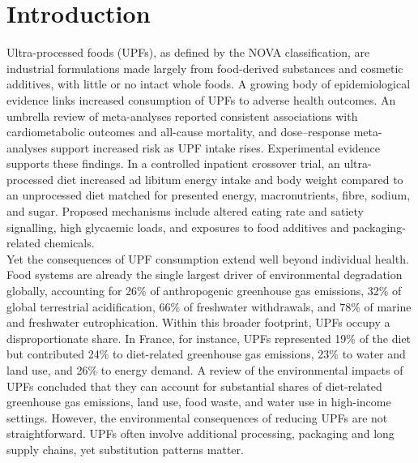 \documentclass{article}
\begin{document}
\thispagestyle{empty}
\clearpage
\bigskip
\thispagestyle{empty}
\clearpage
\setcounter{page}{1}

\section{Introduction}

Ultra-processed foods (UPFs), as defined by the NOVA classification, are industrial formulations made largely from food-derived substances and cosmetic additives, with little or no intact whole foods.\cite{Monteiro2019UPFIdentify,Monteiro2019FAO} A growing body of epidemiological evidence links increased consumption of UPFs to adverse health outcomes. An umbrella review of meta-analyses reported consistent associations with cardiometabolic outcomes and all-cause mortality,\cite{Lane2024BMJ} and dose--response meta-analyses support increased risk as UPF intake rises.\cite{Qu2024} Experimental evidence supports these findings. In a controlled inpatient crossover trial, an ultra-processed diet increased ad libitum energy intake and body weight compared to an unprocessed diet matched for presented energy, macronutrients, fibre, sodium, and sugar.\cite{Hall2019} Proposed mechanisms include altered eating rate and satiety signalling, high glycaemic loads, and exposures to food additives and packaging-related chemicals.\cite{Monteiro2019FAO,Lane2024BMJ,Yates2024}\\

Yet the consequences of UPF consumption extend well beyond individual health. Food systems are already the single largest driver of environmental degradation globally, accounting for 26\% of anthropogenic greenhouse gas emissions, 32\% of global terrestrial acidification, 66\% of freshwater withdrawals, and 78\% of marine and freshwater eutrophication.\cite{PooreNemecek2018,Crippa2021NatureFood} Within this broader footprint, UPFs occupy a disproportionate share. In France, for instance, UPFs represented 19\% of the diet but contributed 24\% to diet-related greenhouse gas emissions, 23\% to water and land use, and 26\% to energy demand.\cite{KesseGuyot2023} A review of the environmental impacts of UPFs concluded that they can account for substantial shares of diet-related greenhouse gas emissions, land use, food waste, and water use in high-income settings.\cite{Anastasiou2022JCP} However, the environmental consequences of reducing UPFs are not straightforward. UPFs often involve additional processing, packaging and long supply chains,\citep{Seferidi2020} yet substitution patterns matter. \\
\end{document}
